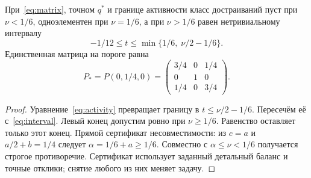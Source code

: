 \begin{theorem}\label{thm:threshold}
{При~\eqref{eq:matrix}, точном $q^*$ и границе активности класс достраиваний пуст при $\nu<1/6$, одноэлементен при $\nu=1/6$, а при $\nu>1/6$ равен нетривиальному интервалу}
\begin{equation}\label{eq:capinterval}
 -1/12\leq t\leq\min\{1/6,\;\nu/2-1/6\}.
\end{equation}
{Единственная матрица на пороге равна}
\begin{equation}\label{eq:singleton}
 P_* = P(0,1/4,0)=\begin{pmatrix}3/4&0&1/4\\0&1&0\\1/4&0&3/4\end{pmatrix}.
\end{equation}
\end{theorem}
\begin{proof}
{Уравнение~\eqref{eq:activity} превращает границу в $t\leq\nu/2-1/6$. Пересечём её с~\eqref{eq:interval}. Левый конец допустим ровно при $\nu\geq1/6$. Равенство оставляет только этот конец. Прямой сертификат несовместимости: из $c=a$ и $a/2+b=1/4$ следует $\alpha=1/6+a\geq1/6$. Совместно с $\alpha\leq\nu<1/6$ получается строгое противоречие. Сертификат использует заданный детальный баланс и точные отклики; снятие любого из них меняет задачу.}
\end{proof}

